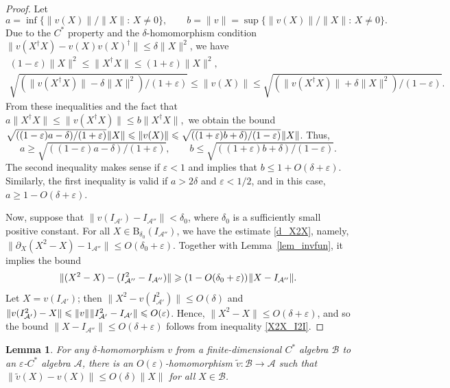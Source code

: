 \documentclass[12pt]{article}
\newcommand{\calA}{\mathcal{A}}
\newcommand{\calB}{\mathcal{B}}
\newcommand{\ts}{\mkern1mu}
\newcommand{\Ba}{\mathrm{B}}
\newcommand{\eps}{\varepsilon}
\renewcommand{\le}{\leqslant}
\renewcommand{\ge}{\geqslant}
\newtheorem{Lemma}[Theorem]{Lemma}
\newtheorem[definition]{Definition}[Theorem]{Definition}
\newtheorem[remark]{Example}[Theorem]{Example}
\newtheorem[remark]{Remark}[Theorem]{Remark}
\newtheorem[remark]{Question}[Theorem]{Open question}
\newtheorem*[definition]{definition}{Definition}
\newtheorem*[remark]{example}{Example}
\newtheorem*[remark]{remark}{Remark}
\newtheorem*[remark]{question}{Open question}
\numberwithin{equation}{section}
\begin{document}
\begin{proof}
Let
\[
a=\inf\{\|v(X)\|/\|X\|:\,X\not=0\},\qquad
b=\|v\|=\sup\{\|v(X)\|/\|X\|:\,X\not=0\}.
\]
Due to the $C^*$ property and the $\delta$-homomorphism condition $\|v(X^{\dag}X)-v(X)v(X)^\dag\|\le\delta\|X\|^2$, we have
{\setlength\abovedisplayskip{-3pt}\begin{gather*}
(1-\eps)\|X\|^2\le\|X^{\dag}X\|\le(1+\eps)\|X\|^2,\\[2pt]
\sqrt{(\|v(X^{\dag}X)\|-\delta\|X\|^2)/(1+\eps)}
\le\|v(X)\|\le \sqrt{(\|v(X^{\dag}X)\|+\delta\|X\|^2)/(1-\eps)}.
\end{gather*}}%
From these inequalities and the fact that $a\|X^{\dag}X\|\le \|v(X^{\dag}X)\|\le b\|X^{\dag}X\|$,\smallskip\ we obtain the bound $\sqrt{((1-\eps)a-\delta)/(1+\eps)}\ts\|X\|\le \|v(X)\| \le\sqrt{((1+\eps)b+\delta)/(1-\eps)}\ts\|X\|$. Thus,
\[
a\ge\sqrt{((1-\eps)a-\delta)/(1+\eps)},\qquad
b\le\sqrt{((1+\eps)b+\delta)/(1-\eps)}.
\]
The second inequality makes sense if $\eps<1$ and implies that $b\le 1+O(\delta+\eps)$. Similarly, the first inequality is valid if $a>2\delta$ and $\eps<1/2$, and in this case, $a\ge 1-O(\delta+\eps)$.

Now, suppose that $\|v(I_{\calA'})-I_{\calA''}\|<\delta_0$, where $\delta_0$ is a sufficiently small positive constant. For all $X\in\Ba_{\delta_0}(I_{\calA''})$, we have the estimate \eqref{d_X2X}, namely, $\|\partial_{X}(X^2-X)-1_{\calA''}\|\le O(\delta_0+\eps)$. Together with Lemma~\ref{lem_invfun}, it implies the bound
\begin{equation}\label{X2X_I2I}
\|(X^2-X)-(I_{\calA''}^2-I_{\calA''})\|\ge(1-O(\delta_0+\eps))\ts\|X-I_{\calA''}\|.
\end{equation}
Let $X=v(I_{\calA'})$; then $\|X^2-v(I_{\calA'}^2)\|\le O(\delta)$ and $\|v(I_{\calA'}^2)-X\|\le\|v\|\ts\|I_{\calA'}^2-I_{\calA'}\|\le O(\eps)$. Hence, $\|X^2-X\|\le O(\delta+\eps)$, and so the bound $\|X-I_{\calA''}\|\le O(\delta+\eps)$ follows from inequality \eqref{X2X_I2I}.
\end{proof}

\begin{Lemma}\label{lem_approx}
For any $\delta$-homomorphism $v$ from a finite-dimensional $C^*$ algebra $\calB$ to an $\eps$-$C^*$ algebra $\calA$, there is an $O(\eps)$-homomorphism $\tilde{v}\colon \calB\to\calA$ such that $\|\tilde{v}(X)-v(X)\|\le O(\delta)\|X\|$ for all $X\in\calB$.
\end{Lemma}
\end{document}
